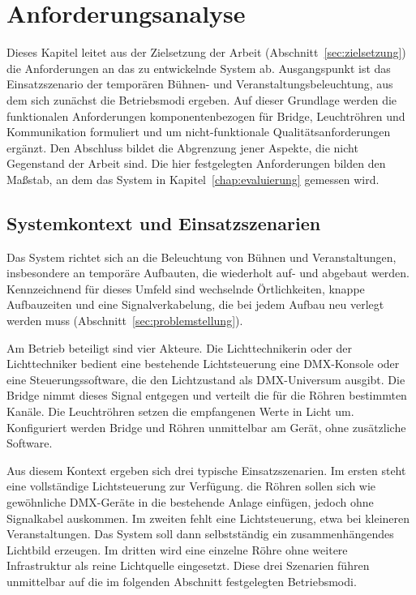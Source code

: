 \chapter{Anforderungsanalyse}
\label{chap:anforderungsanalyse}

Dieses Kapitel leitet aus der Zielsetzung der Arbeit
(Abschnitt~\ref{sec:zielsetzung}) die Anforderungen an das zu entwickelnde System ab.
Ausgangspunkt ist das Einsatzszenario der temporären Bühnen- und
Veranstaltungsbeleuchtung, aus dem sich zunächst die Betriebsmodi ergeben. Auf dieser
Grundlage werden die funktionalen Anforderungen komponentenbezogen für Bridge,
Leuchtröhren und Kommunikation formuliert und um nicht-funktionale
Qualitätsanforderungen ergänzt. Den Abschluss bildet die Abgrenzung jener Aspekte, die
nicht Gegenstand der Arbeit sind. Die hier festgelegten Anforderungen bilden den
Maßstab, an dem das System in Kapitel~\ref{chap:evaluierung} gemessen wird.

\section{Systemkontext und Einsatzszenarien}
\label{sec:systemkontext}

Das System richtet sich an die Beleuchtung von Bühnen und Veranstaltungen, insbesondere
an temporäre Aufbauten, die wiederholt auf- und abgebaut werden. Kennzeichnend für
dieses Umfeld sind wechselnde Örtlichkeiten, knappe Aufbauzeiten und eine
Signalverkabelung, die bei jedem Aufbau neu verlegt werden muss
(Abschnitt~\ref{sec:problemstellung}).

Am Betrieb beteiligt sind vier Akteure. Die Lichttechnikerin oder der Lichttechniker
bedient eine bestehende Lichtsteuerung eine DMX-Konsole oder eine
Steuerungssoftware, die den Lichtzustand als DMX-Universum ausgibt. Die Bridge nimmt
dieses Signal entgegen und verteilt die für die Röhren bestimmten Kanäle. Die
Leuchtröhren setzen die empfangenen Werte in Licht um. Konfiguriert werden Bridge und
Röhren unmittelbar am Gerät, ohne zusätzliche Software.

Aus diesem Kontext ergeben sich drei typische Einsatzszenarien. Im ersten steht eine
vollständige Lichtsteuerung zur Verfügung. die Röhren sollen sich wie gewöhnliche
DMX-Geräte in die bestehende Anlage einfügen, jedoch ohne Signalkabel auskommen. Im
zweiten fehlt eine Lichtsteuerung, etwa bei kleineren Veranstaltungen. Das System soll
dann selbstständig ein zusammenhängendes Lichtbild erzeugen. Im dritten wird eine
einzelne Röhre ohne weitere Infrastruktur als reine Lichtquelle eingesetzt. Diese drei
Szenarien führen unmittelbar auf die im folgenden Abschnitt festgelegten
Betriebsmodi.

